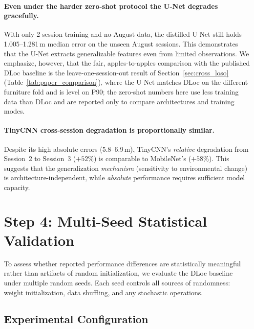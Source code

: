 \documentclass[11pt,a4paper]{article}
\begin{document}
\paragraph{Even under the harder zero-shot protocol the U-Net degrades gracefully.}
With only 2-session training and no August data, the distilled U-Net still holds 1.005--1.281\,m median error on the unseen August sessions.
This demonstrates that the U-Net extracts generalizable features even from limited observations.
We emphasize, however, that the fair, apples-to-apples comparison with the published DLoc baseline is the leave-one-session-out result of Section~\ref{sec:cross_loso} (Table~\ref{tab:paper_comparison}), where the U-Net matches DLoc on the different-furniture fold and is level on P90; the zero-shot numbers here use less training data than DLoc and are reported only to compare architectures and training modes.

\paragraph{TinyCNN cross-session degradation is proportionally similar.}
Despite its high absolute errors (5.8--6.9\,m), TinyCNN's \emph{relative} degradation from Session~2 to Session~3 ($+52\%$) is comparable to MobileNet's ($+58\%$).
This suggests that the generalization \emph{mechanism} (sensitivity to environmental change) is architecture-independent, while \emph{absolute} performance requires sufficient model capacity.


\section{Step 4: Multi-Seed Statistical Validation}
\label{sec:multiseed}

To assess whether reported performance differences are statistically meaningful rather than artifacts of random initialization, we evaluate the DLoc baseline under multiple random seeds.
Each seed controls all sources of randomness: weight initialization, data shuffling, and any stochastic operations.

\subsection{Experimental Configuration}
\end{document}
